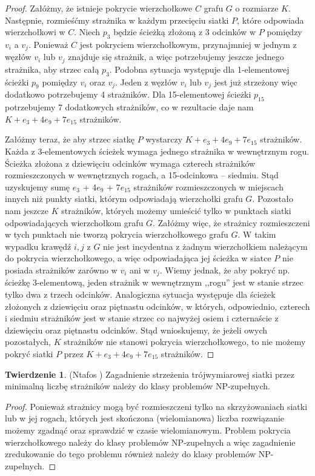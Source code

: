 \documentclass[brudnopis]{xmgr}
\theoremstyle{definition}
\newtheorem{Twierdzenie}{Twierdzenie}
\begin{document}
\begin{proof} 
	Załóżmy, że istnieje pokrycie wierzchołkowe $C$ grafu $G$ o rozmiarze $K$. Następnie, rozmieśćmy strażnika w każdym przecięciu siatki $P$, które odpowiada wierzchołkowi w $C$.
	Niech $p_3$ będzie ścieżką złożoną z 3 odcinków w $P$ pomiędzy $v_i$ a $v_j$. Ponieważ $C$ jest pokryciem wierzchołkowym, przynajmniej w jednym z węzłów $v_i$ lub $v_j$ znajduje się strażnik, a więc potrzebujemy jeszcze jednego strażnika, aby strzec całą $p_3$. Podobna sytuacja występuje dla 1-elementowej ścieżki $p_9$ pomiędzy $v_i$ oraz $v_j$. Jeden z węzłów $v_i$ lub $v_j$ jest już strzeżony więc dodatkowo potrzebujemy 4 strażników. Dla 15-elementowej ścieżki $p_{15}$ potrzebujemy 7 dodatkowych strażników, co w rezultacie daje nam $K + e_3 + 4e_9 + 7e_{15}$ strażników.

	\indent Załóżmy teraz, że aby strzec siatkę $P$ wystarczy $K + e_3 + 4e_9 + 7e_{15}$ strażników. Każda z 3-elementowych ścieżek wymaga jednego strażnika w wewnętrznym rogu. Ścieżka złożona z dziewięciu odcinków wymaga czterech strażników rozmieszczonych w wewnętrznych rogach, a 15-odcinkowa -- siedmiu. Stąd uzyskujemy sumę $e_3$ + 4$e_9$ + 7$e_{15}$ strażników rozmieszczonych w miejscach innych niż punkty siatki, którym odpowiadają wierzchołki grafu $G$. Pozostało nam jeszcze $K$ strażników, których możemy umieścić tylko w punktach siatki odpowiadających wierzchołkom grafu $G$. Załóżmy więc, że strażnicy rozmieszczeni w tych punktach nie tworzą pokrycia wierzchołkowego grafu $G$. W takim wypadku krawędź ${i, j}$ z $G$ nie jest incydentna z żadnym wierzchołkiem należącym do pokrycia wierzchołkowego, a więc odpowiadająca jej ścieżka w siatce $P$ nie posiada strażników zarówno w $v_i$ ani w $v_j$. Wiemy jednak, że aby pokryć np. ścieżkę 3-elementową, jeden strażnik w wewnętrznym ,,rogu'' jest w stanie strzec tylko dwa z trzech odcinków. Analogiczna sytuacja występuje dla ścieżek złożonych z dziewięciu oraz piętnastu odcinków, w których, odpowiednio, czterech i siedmiu strażników jest w stanie strzec co najwyżej osiem i czternaście z dziewięciu oraz piętnastu odcinków. Stąd wnioskujemy, że jeżeli owych pozostałych, $K$ strażników nie stanowi pokrycia wierzchołkowego, to nie możemy pokryć siatki $P$ przez $K + e_3 + 4e_9 + 7e_{15}$ strażników. 
\end{proof}

\begin{Twierdzenie} (Ntafos \cite{ntafos})
	Zagadnienie strzeżenia trójwymiarowej siatki przez minimalną liczbę strażników należy do klasy problemów NP-zupełnych.
\end{Twierdzenie}
\begin{proof} 
	Ponieważ strażnicy mogą być rozmieszczeni tylko na skrzyżowaniach siatki lub w jej rogach, których jest skończona (wielomianowa) liczba rozwiązanie możemy zgadnąć oraz sprawdzić w czasie wielomianowym. Problem pokrycia wierzchołkowego należy do klasy problemów NP-zupełnych a więc zagadnienie zredukowanie do tego problemu również należy do klasy problemów NP-zupełnych.
\end{proof}
\end{document}
